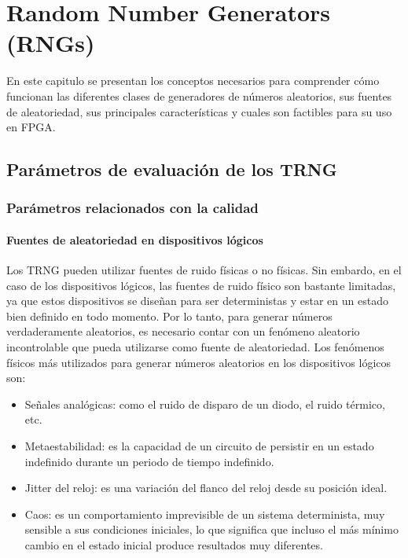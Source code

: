 \chapter{Random Number Generators (RNGs)}

    En este capitulo se presentan los conceptos necesarios para comprender cómo funcionan las diferentes clases de generadores de números aleatorios, sus fuentes de aleatoriedad, sus principales características y cuales son factibles para su uso en FPGA.

   
    \section{Parámetros de evaluación de los TRNG}
        
        \subsection{Parámetros relacionados con la calidad}	

            \subsubsection{Fuentes de aleatoriedad en dispositivos lógicos} 

            Los TRNG pueden utilizar fuentes de ruido físicas o no físicas. Sin embardo, en el caso de los dispositivos lógicos, las fuentes de ruido físico son bastante limitadas, ya que estos dispositivos se diseñan para ser deterministas y estar en un estado bien definido en todo momento. Por lo tanto, para generar números verdaderamente aleatorios, es necesario contar con un fenómeno aleatorio incontrolable que pueda utilizarse como fuente de aleatoriedad. Los fenómenos físicos más utilizados para generar números aleatorios en los dispositivos lógicos son:
	
            \begin{itemize}[noitemsep]
                \item Señales analógicas: como el ruido de disparo de un diodo, el ruido térmico, etc.		

                \item Metaestabilidad: es la capacidad de un circuito de persistir en un estado indefinido durante un periodo de tiempo indefinido.
                
                \item Jitter del reloj: es una variación del flanco del reloj desde su posición ideal.
                
                \item Caos: es un comportamiento imprevisible de un sistema determinista, muy sensible a sus condiciones iniciales, lo que significa que incluso el más mínimo cambio en el estado inicial produce resultados muy diferentes.
            \end{itemize}		
	
